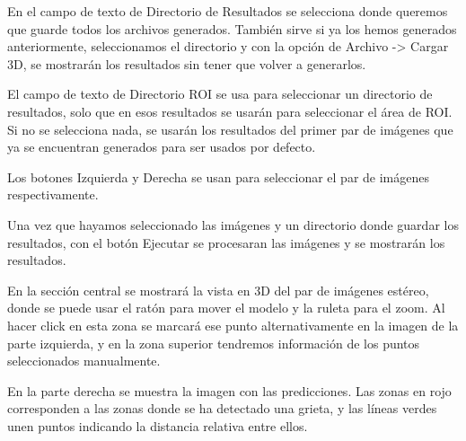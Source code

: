 
En el campo de texto de Directorio de Resultados se selecciona donde queremos que guarde todos los archivos generados. También sirve si ya los hemos generados anteriormente, seleccionamos el directorio y con la opción de Archivo -> Cargar 3D, se mostrarán los resultados sin tener que volver a generarlos.

El campo de texto de Directorio ROI se usa para seleccionar un directorio de resultados, solo que en esos resultados se usarán para seleccionar el área de ROI. Si no se selecciona nada, se usarán los resultados del primer par de imágenes que ya se encuentran generados para ser usados por defecto.

Los botones Izquierda y Derecha se usan para seleccionar el par de imágenes respectivamente.

Una vez que hayamos seleccionado las imágenes y un directorio donde guardar los resultados, con el botón Ejecutar se procesaran las imágenes y se mostrarán los resultados.


En la sección central se mostrará la vista en 3D del par de imágenes estéreo, donde se puede usar el ratón para mover el modelo y la ruleta para el zoom. Al hacer click en esta zona se marcará ese punto alternativamente en la imagen de la parte izquierda, y en la zona superior tendremos información de los puntos seleccionados manualmente.

En la parte derecha se muestra la imagen con las predicciones. Las zonas en rojo corresponden a las zonas donde se ha detectado una grieta, y las líneas verdes unen puntos indicando la distancia relativa entre ellos.
